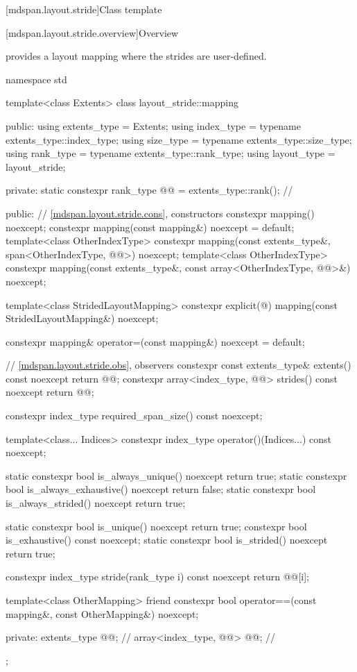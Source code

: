 [mdspan.layout.stride]{Class template }

[mdspan.layout.stride.overview]{Overview}

\pnum
{} provides a layout mapping
where the strides are user-defined.

\begin{codeblock}
namespace std {
  template<class Extents>
  class layout_stride::mapping {
  public:
    using extents_type = Extents;
    using index_type = typename extents_type::index_type;
    using size_type = typename extents_type::size_type;
    using rank_type = typename extents_type::rank_type;
    using layout_type = layout_stride;

  private:
    static constexpr rank_type @@ = extents_type::rank();    // \expos

  public:
    // \ref{mdspan.layout.stride.cons}, constructors
    constexpr mapping() noexcept;
    constexpr mapping(const mapping&) noexcept = default;
    template<class OtherIndexType>
      constexpr mapping(const extents_type&, span<OtherIndexType, @@>) noexcept;
    template<class OtherIndexType>
      constexpr mapping(const extents_type&, const array<OtherIndexType, @@>&) noexcept;

    template<class StridedLayoutMapping>
      constexpr explicit(@\seebelow@) mapping(const StridedLayoutMapping&) noexcept;

    constexpr mapping& operator=(const mapping&) noexcept = default;

    // \ref{mdspan.layout.stride.obs}, observers
    constexpr const extents_type& extents() const noexcept { return @@; }
    constexpr array<index_type, @@> strides() const noexcept { return @@; }

    constexpr index_type required_span_size() const noexcept;

    template<class... Indices>
      constexpr index_type operator()(Indices...) const noexcept;

    static constexpr bool is_always_unique() noexcept { return true; }
    static constexpr bool is_always_exhaustive() noexcept { return false; }
    static constexpr bool is_always_strided() noexcept { return true; }

    static constexpr bool is_unique() noexcept { return true; }
    constexpr bool is_exhaustive() const noexcept;
    static constexpr bool is_strided() noexcept { return true; }

    constexpr index_type stride(rank_type i) const noexcept { return @@[i]; }

    template<class OtherMapping>
      friend constexpr bool operator==(const mapping&, const OtherMapping&) noexcept;

  private:
    extents_type @@{};                    // \expos
    array<index_type, @@> @@{};        // \expos
  };
}
\end{codeblock}

